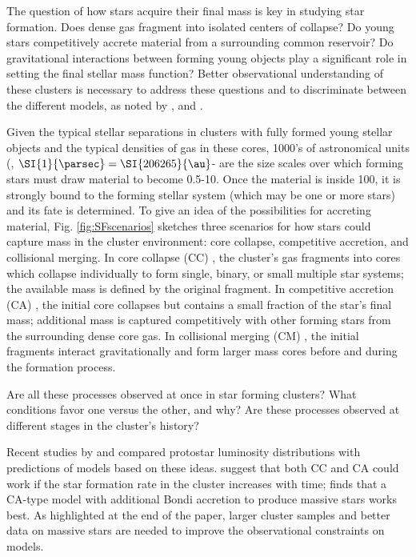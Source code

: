 The question of how stars acquire their final mass is key in studying star formation. Does dense gas fragment into isolated centers of collapse? Do young stars competitively accrete material from a surrounding common reservoir? Do gravitational interactions between forming young objects play a significant role in setting the final stellar mass function? Better observational understanding of these clusters is necessary to address these questions and to discriminate between the different models, as noted by \citet{Bonnell:2006ee}, \citet{Offner:2011ex} and \citet{Myers:2011fy}.

Given the typical stellar separations in clusters with fully formed young stellar objects and the typical densities of gas in these cores, \num{1000}'s of astronomical units (\si{\au}, $\SI{1}{\parsec} = \SI{206265}{\au} $- are the size scales over which forming stars must draw material to become 0.5-\SI{10}{\Msun}. Once the material is inside \SI{100}{\au}, it is strongly bound to the forming stellar system (which may be one or more stars) and its fate is determined. To give an idea of the possibilities for accreting material, Fig. \ref{fig:SFscenarios} sketches three scenarios for how stars could capture mass in the cluster environment: core collapse, competitive accretion, and collisional merging. In core collapse (CC) \citep[Fig.~\ref{subfig:scenarios:a},][]{McKee:2003gxa, Myers:2011fy}, the cluster's gas fragments into cores which collapse individually to form single, binary, or small multiple star systems; the available mass is defined by the original fragment. In competitive accretion (CA) \citep[Fig.~\ref{subfig:scenarios:b},][]{Bonnell:1997vta}, the initial core collapses but contains a small fraction of the star's final mass; additional mass is captured competitively with other forming stars from the surrounding dense core gas. In collisional merging (CM) \citep[Fig.~\ref{subfig:scenarios:c},][]{Bonnell:2002et}, the initial fragments interact gravitationally and form larger mass cores before and during the formation process. 

Are all these processes observed at once in star forming clusters? What conditions favor one versus the other, and why? Are these processes observed at different stages in the cluster's history?

Recent studies by \citet{Offner:2011ex} and \citet{Myers:2011fy} compared protostar luminosity distributions with predictions of models based on these ideas. \citet{Offner:2011ex} suggest that both CC and CA could work if the star formation rate in the cluster increases with time; \citep{Myers:2011fy} finds that a CA-type model with additional Bondi accretion to produce massive stars works best. As highlighted at the end of the \citet{Offner:2011ex} paper, larger cluster samples and better data on massive stars are needed to improve the observational constraints on models.


